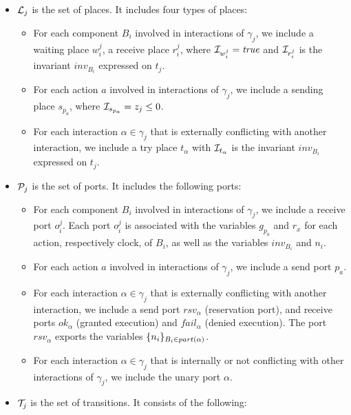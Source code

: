 \begin{definition}[Scheduler]
\begin{itemize}
\begin{itemize}
        \item $\mathcal{L}_j$ is the set of places. It includes four types of places:
        \begin{itemize}
          \item For each component $B_i$ involved in interactions of $\gamma_j$, we include
            a waiting place $w_i^j$, a receive place $r_i^j$, where $\mathcal{I}_{w_i^j}=\textnormal{\textit{true}}$
            and $\mathcal{I}_{r_i^j}$ is the invariant $inv_{B_i}$ expressed on $t_j$.
          \item For each action $a$ involved in interactions of $\gamma_j$, we include a sending
            place $s_{p_a}$, where $\mathcal{I}_{s_{p_a}}=z_j\le0$.
          \item For each interaction $\alpha\in\gamma_j$ that is externally conflicting 
            with another interaction, we include a try place $t_{\alpha}$ with 
            $\mathcal{I}_{t_{\alpha}}$ is the invariant $inv_{B_i}$ expressed on $t_j$.
        \end{itemize}
        \item $\mathcal{P}_j$ is the set of ports. It includes the following ports:
          \begin{itemize}
            \item For each component $B_i$ involved in interactions of $\gamma_j$, we include
              a receive port $o_i^j$. Each port $o_i^j$ is associated with the variables
              $g_{p_a}$ and $r_x$ for each action, respectively clock, of $B_i$, as well
              as the variables $inv_{B_i}$ and $n_i$.
            \item For each action $a$ involved in interactions of $\gamma_j$, we include 
              a send port $p_a$.
            \item For each interaction $\alpha\in\gamma_j$ that is externally conflicting with
              another interaction, we include a send port $rsv_{\alpha}$ (reservation port), 
              and receive ports $ok_{\alpha}$ (granted execution) and $fail_{\alpha}$ (denied 
              execution). The port $rsv_{\alpha}$ exports the variables $\{n_i\}_{B_i
              \in part(\alpha)}$.
            \item For each interaction $\alpha\in\gamma_j$ that is internally or not conflicting
              with other interactions of $\gamma_j$, we include the unary port $\alpha$.
          \end{itemize}
        \item $\mathcal{T}_j$ is the set of transitions. It consists of the following:

\end{itemize}
\end{itemize}
\end{definition}
